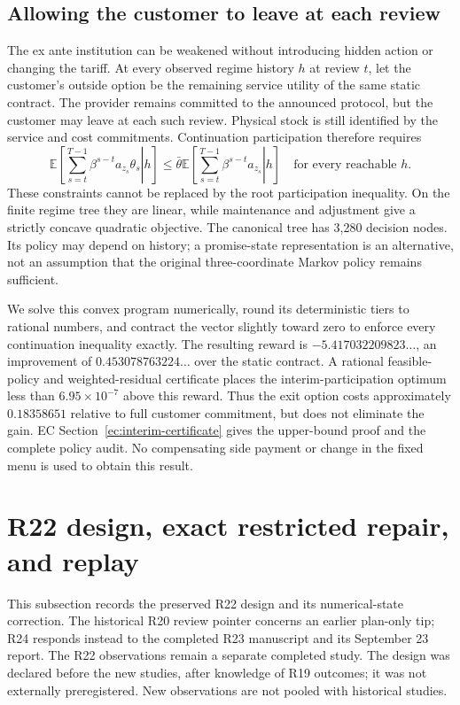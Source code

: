 \documentclass[11pt,letterpaper]{article}
\theoremstyle{definition}
\newcommand{\E}{\mathbb E}
\newcommand{\1}{\mathbf 1}
\begin{document}
\subsection{Allowing the customer to leave at each review}\label{sec:interim}
The ex ante institution can be weakened without introducing hidden action or changing the tariff. At every observed regime history $h$ at review $t$, let the customer's outside option be the remaining service utility of the same static contract. The provider remains committed to the announced protocol, but the customer may leave at each such review. Physical stock is still identified by the service and cost commitments. Continuation participation therefore requires
\begin{equation}\label{eq:interim}
 \E\left[\left.\sum_{s=t}^{T-1}\beta^{s-t}a_{z_s}\theta_s\right|h\right]
 \leq\bar\theta\E\left[\left.\sum_{s=t}^{T-1}\beta^{s-t}a_{z_s}\right|h\right]
 \quad\text{for every reachable }h.
\end{equation}
These constraints cannot be replaced by the root participation inequality. On the finite regime tree they are linear, while maintenance and adjustment give a strictly concave quadratic objective. The canonical tree has 3,280 decision nodes. Its policy may depend on history; a promise-state representation is an alternative, not an assumption that the original three-coordinate Markov policy remains sufficient.

We solve this convex program numerically, round its deterministic tiers to rational numbers, and contract the vector slightly toward zero to enforce every continuation inequality exactly. The resulting reward is $-5.417032209823\ldots$, an improvement of $0.453078763224\ldots$ over the static contract. A rational feasible-policy and weighted-residual certificate places the interim-participation optimum less than $6.95\times10^{-7}$ above this reward. Thus the exit option costs approximately $0.18358651$ relative to full customer commitment, but does not eliminate the gain. EC Section~\ref{ec:interim-certificate} gives the upper-bound proof and the complete policy audit. No compensating side payment or change in the fixed menu is used to obtain this result.




\section{R22 design, exact restricted repair, and replay}\label{ec:r22-details}
This subsection records the preserved R22 design and its numerical-state correction. The historical R20 review pointer concerns an earlier plan-only tip; R24 responds instead to the completed R23 manuscript and its September 23 report. The R22 observations remain a separate completed study. The design was declared before the new studies, after knowledge of R19 outcomes; it was not externally preregistered. New observations are not pooled with historical studies.
\end{document}
